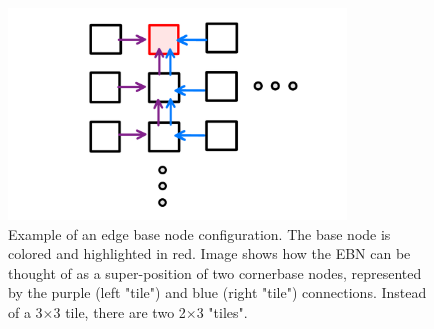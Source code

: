\begin{figure}[]
\centering
\includegraphics[width=0.8\textwidth]{images/EBN_superposition.pdf}
\caption{Example of an edge base node configuration.
The base node is colored and highlighted in red.
Image shows how the EBN can be thought of as a super-position of two cornerbase nodes, represented by the purple (left "tile") and blue (right "tile") connections.
Instead of a 3$\times$3 tile, there are two 2$\times$3 "tiles".
}
\label{fig:ebn}
\end{figure}
